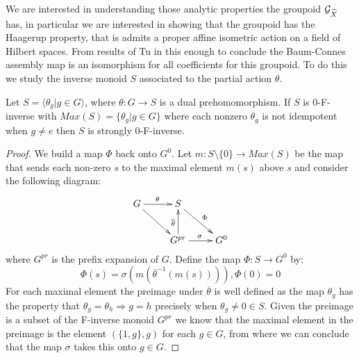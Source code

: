 \begin{conjecture}
We are interested in understanding those analytic properties the groupoid $\mathcal{G}_{\widehat{X}}$ has, in particular we are interested in showing that the groupoid has the Haagerup property, that is admits a proper affine isometric action on a field of Hilbert spaces. From results of Tu in \cite{MR1703305} this enough to conclude the Baum-Connes assembly map is an isomorphism for all coefficients for this groupoid. To do this we study the inverse monoid $S$ associated to the partial action $\theta$.

\begin{proposition}\label{Prop:Strongly}
Let $S = \langle \theta_{g} | g \in G \rangle$, where $\theta: G \rightarrow S$ is a dual prehomomorphism. If $S$ is 0-F-inverse with $Max(S) = \lbrace \theta_{g} | g \in G \rbrace$ where each nonzero $\theta_{g}$ is not idempotent when $g \not = e$ then $S$ is strongly 0-F-inverse.
\end{proposition}
\begin{proof}
We build a map $\Phi$ back onto $G^{0}$. Let $m: S\setminus \lbrace 0 \rbrace \rightarrow Max(S)$ be the map that sends each non-zero $s$ to the maximal element $m(s)$ above $s$ and consider the following diagram:
\begin{equation*}
\xymatrix{
G\ar@{->}[r]^{\theta}\ar@{->}[dr]^{}  & S\ar@{->}[dr]^{\Phi}  & \\
  & G^{pr} \ar@{->}[r]^{\sigma}\ar@{->}[u]^{\overline{\theta}}  & G^{0}
}
\end{equation*}
where $G^{pr}$ is the prefix expansion of $G$. Define the map $\Phi:S \rightarrow G^{0}$ by:
\begin{equation*}
\Phi(s)=\sigma ( m ( \overline{\theta}^{-1} (m(s)))), \Phi(0)=0
\end{equation*}
For each maximal element the preimage under $\overline{\theta}$ is well defined as the map $\theta_{g}$ has the property that $\theta_{g}=\theta_{h} \Rightarrow g=h$ precisely when $\theta_{g} \not = 0 \in S$. Given the preimage is a subset of the F-inverse monoid $G^{pr}$ we know that the maximal element in the preimage is the element $(\lbrace 1,g \rbrace,g)$ for each $g \in G$, from where we can conclude that the map $\sigma$ takes this onto $g \in G$.


\end{proof}
\end{conjecture}
